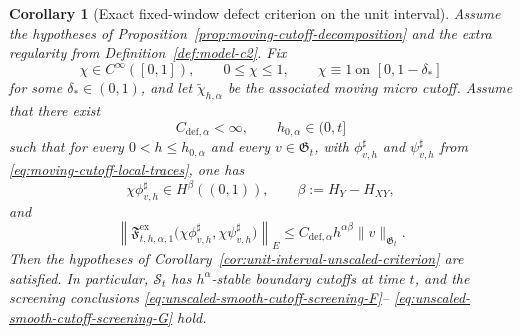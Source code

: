\documentclass[11pt,a4paper]{amsart}
\theoremstyle{plain}
\newtheorem{corollary}[theorem]{Corollary}
\theoremstyle{definition}
\theoremstyle{remark}
\begin{document}
\begin{corollary}[Exact fixed-window defect criterion on the unit interval]
\label{cor:unit-interval-defect-criterion}
Assume the hypotheses of Proposition~\ref{prop:moving-cutoff-decomposition} and the extra regularity
from Definition~\ref{def:model-c2}. Fix
\[
\chi\in C^\infty([0,1]),
\qquad
0\le \chi\le1,
\qquad
\chi\equiv1\ \text{on }[0,1-\delta_*]
\]
for some \(\delta_*\in(0,1)\), and let \(\widetilde\chi_{h,\alpha}\) be the associated moving micro
cutoff. Assume that there exist
\[
C_{\mathrm{def},\alpha}<\infty,
\qquad
h_{0,\alpha}\in(0,t]
\]
such that for every \(0<h\le h_{0,\alpha}\) and every \(v\in\mathfrak G_t\), with
\(\phi_{v,h}^{\sharp}\) and \(\psi_{v,h}^{\sharp}\) from
\eqref{eq:moving-cutoff-local-traces}, one has
\[
\chi\phi_{v,h}^{\sharp}\in H^\beta((0,1)),
\qquad
\beta:=H_Y-H_{XY},
\]
and
\begin{equation}\label{eq:unit-interval-defect-criterion}
\left\|
\mathfrak F_{t,h,\alpha,1}^{\mathrm{ex}}
\bigl(
\chi\phi_{v,h}^{\sharp},
\chi\psi_{v,h}^{\sharp}
\bigr)
\right\|_{E}
\le
C_{\mathrm{def},\alpha}h^{\alpha\beta}\|v\|_{\mathfrak G_t}.
\end{equation}
Then the hypotheses of Corollary~\ref{cor:unit-interval-unscaled-criterion} are satisfied. In
particular, \(\mathcal S_t\) has \(h^\alpha\)-stable boundary cutoffs at time \(t\), and the
screening conclusions \eqref{eq:unscaled-smooth-cutoff-screening-F}--
\eqref{eq:unscaled-smooth-cutoff-screening-G} hold.
\end{corollary}
\end{document}
